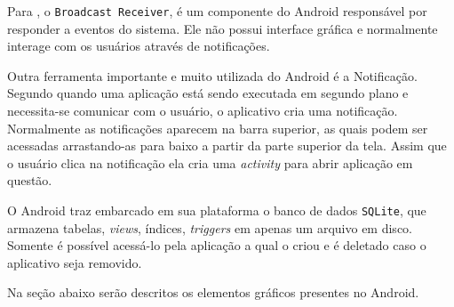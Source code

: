	\par Para , o \texttt{Broadcast Receiver},
é um componente do Android responsável por responder a eventos do sistema.
Ele não possui interface gráfica e normalmente interage com os usuários através
de notificações.

	\par Outra ferramenta importante e muito utilizada do Android é a Notificação.
Segundo  quando uma aplicação está sendo
executada em segundo plano e necessita-se comunicar com o usuário, o
aplicativo cria uma notificação. Normalmente as notificações aparecem na barra
superior, as quais podem ser acessadas arrastando-as para baixo a partir da
parte superior da tela. Assim que o usuário clica na notificação ela cria uma
\textit{activity} para abrir  aplicação em questão.

	\par O Android traz embarcado em sua plataforma o banco de dados
\texttt{SQLite}, que armazena tabelas, \textit{views}, índices,
\textit{triggers} em apenas um arquivo em disco. Somente é possível acessá-lo
pela aplicação a qual o criou e é deletado caso o aplicativo seja removido.

	\par Na seção abaixo serão descritos os elementos gráficos presentes no
Android.

	